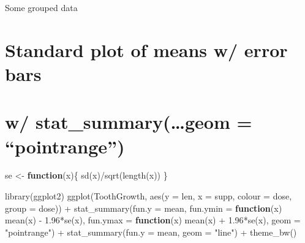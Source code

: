 \documentclass[
]{book}
\newenvironment{Shaded}{\begin{snugshade}}{\end{snugshade}}
\newcommand{\AttributeTok}[1]{\textcolor[rgb]{0.77,0.63,0.00}{#1}}
\newcommand{\ControlFlowTok}[1]{\textcolor[rgb]{0.13,0.29,0.53}{\textbf{#1}}}
\newcommand{\FloatTok}[1]{\textcolor[rgb]{0.00,0.00,0.81}{#1}}
\newcommand{\FunctionTok}[1]{\textcolor[rgb]{0.00,0.00,0.00}{#1}}
\newcommand{\NormalTok}[1]{#1}
\newcommand{\OtherTok}[1]{\textcolor[rgb]{0.56,0.35,0.01}{#1}}
\newcommand{\SpecialCharTok}[1]{\textcolor[rgb]{0.00,0.00,0.00}{#1}}
\newcommand{\StringTok}[1]{\textcolor[rgb]{0.31,0.60,0.02}{#1}}
\begin{document}
Some grouped data

\begin{Shaded}
\end{Shaded}

\hypertarget{standard-plot-of-means-w-error-bars}{%
\section{Standard plot of means w/ error bars}\label{standard-plot-of-means-w-error-bars}}

\hypertarget{w-stat_summarygeom-pointrange}{%
\section{w/ stat\_summary(\ldots geom = ``pointrange'')}\label{w-stat_summarygeom-pointrange}}

\begin{Shaded}
\begin{Highlighting}[]
\NormalTok{se }\OtherTok{\textless{}{-}} \ControlFlowTok{function}\NormalTok{(x)\{}
  \FunctionTok{sd}\NormalTok{(x)}\SpecialCharTok{/}\FunctionTok{sqrt}\NormalTok{(}\FunctionTok{length}\NormalTok{(x))}
\NormalTok{\}}
\end{Highlighting}
\end{Shaded}

\begin{Shaded}
\begin{Highlighting}[]
\FunctionTok{library}\NormalTok{(ggplot2)}
\FunctionTok{ggplot}\NormalTok{(ToothGrowth, }
       \FunctionTok{aes}\NormalTok{(}\AttributeTok{y =}\NormalTok{ len, }\AttributeTok{x =}\NormalTok{ supp, }\AttributeTok{colour =}\NormalTok{ dose, }\AttributeTok{group =}\NormalTok{ dose)) }\SpecialCharTok{+} 
  \FunctionTok{stat\_summary}\NormalTok{(}\AttributeTok{fun.y =}\NormalTok{ mean,}
               \AttributeTok{fun.ymin =} \ControlFlowTok{function}\NormalTok{(x) }\FunctionTok{mean}\NormalTok{(x) }\SpecialCharTok{{-}} \FloatTok{1.96}\SpecialCharTok{*}\FunctionTok{se}\NormalTok{(x), }
               \AttributeTok{fun.ymax =} \ControlFlowTok{function}\NormalTok{(x) }\FunctionTok{mean}\NormalTok{(x) }\SpecialCharTok{+} \FloatTok{1.96}\SpecialCharTok{*}\FunctionTok{se}\NormalTok{(x), }
               \AttributeTok{geom =} \StringTok{"pointrange"}\NormalTok{) }\SpecialCharTok{+}
  \FunctionTok{stat\_summary}\NormalTok{(}\AttributeTok{fun.y =}\NormalTok{ mean,}
               \AttributeTok{geom =} \StringTok{"line"}\NormalTok{) }\SpecialCharTok{+}
  \FunctionTok{theme\_bw}\NormalTok{()}
\end{Highlighting}
\end{Shaded}
\end{document}
